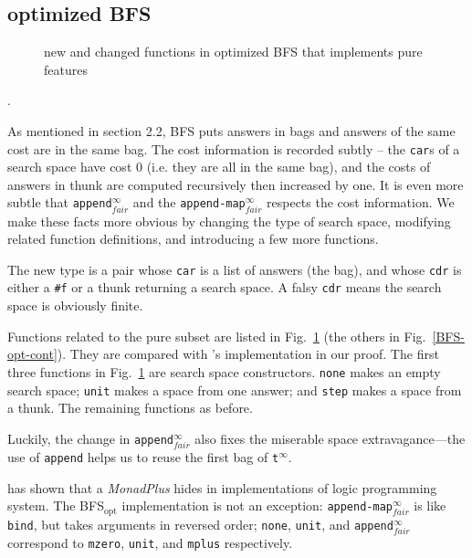 \documentclass[format=acmlarge, review=true, authordraft=true]{acmart}
\newcommand{\BFSopt}[0]{BFS$_\textrm{opt}$}
\begin{document}
\subsection{optimized BFS}

\begin{figure}
		
	\caption{new and changed functions in optimized BFS that implements pure 
	features}
	\label{BFS-opt}
\end{figure}

.

As mentioned in section 2.2, BFS puts answers in bags and answers of the 
same cost are in the same bag. The cost
information is recorded subtly -- the \texttt{car}s of a search space have cost 
0 (i.e. they are all in the same bag), and the costs of answers in thunk are 
computed recursively then increased by one. It is even more subtle that
\texttt{append$^\infty_{fair}$} and the \texttt{append-map$^\infty_{fair}$} 
respects the cost information. We make these facts more obvious by 
changing the type of search space, modifying related function definitions, 
and introducing a few more functions.

The new type is a pair whose \texttt{car} is a list of answers (the bag), and 
whose \texttt{cdr} is either a \texttt{\#{}f} or a thunk returning a search 
space. A falsy \texttt{cdr} means the search space is obviously finite. 

Functions related to the pure subset are listed in Fig.~\ref{BFS-opt} (the 
others in Fig.~\ref{BFS-opt-cont}). They are compared with 
\citeauthor{seres1999algebra}'s implementation in our proof. The first three 
functions in Fig.~\ref{BFS-opt} are search space constructors. \texttt{none} 
makes an empty search space; \texttt{unit} makes a space from one answer; and 
\texttt{step} makes a space from a thunk. The remaining functions as before.

Luckily, the change in \texttt{append$^\infty_{fair}$} also fixes the miserable 
space 
extravagance---the use of \texttt{append} helps us to reuse the first bag of 
\texttt{t$^\infty$}.

\citet{kiselyov2005backtracking} has shown that a \emph{MonadPlus} hides in 
implementations of logic programming system. The \BFSopt{} implementation is not 
an exception: \texttt{append-map$^\infty_{fair}$} is like \texttt{bind}, 
but takes arguments in reversed order; \texttt{none}, \texttt{unit}, and 
\texttt{append$^\infty_{fair}$} correspond to \texttt{mzero}, \texttt{unit}, 
and \texttt{mplus} respectively.
\end{document}
